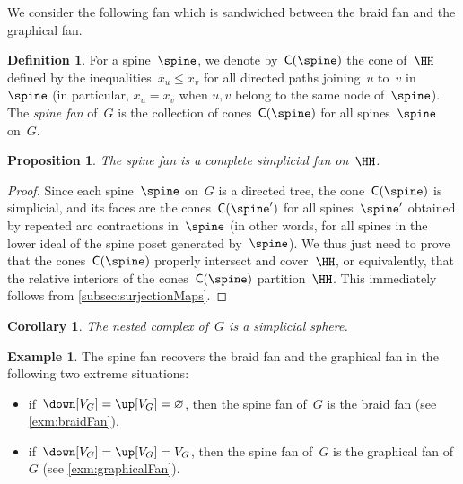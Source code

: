\documentclass{amsart}
\newtheorem{corollary}[theorem]{Corollary}
\newtheorem{proposition}[theorem]{Proposition}
\theoremstyle{definition}
\newtheorem{definition}[theorem]{Definition}
\newtheorem{example}[theorem]{Example}
\renewcommand{\b}[1]{{\boldsymbol{#1}}} %
\newcommand{\set}[2]{\left\{ #1 \;\middle|\; #2 \right\}} %
\newcommand{\eqdef}{\mbox{\,\raisebox{0.2ex}{\scriptsize\ensuremath{\mathrm:}}\ensuremath{=}\,}} %
\newcommand{\darkblue}{\color{darkblue}} %
\newcommand{\defn}[1]{\textsl{\darkblue #1}} %
\newcommand{\vincent}[1]{\todo[color=blue!30]{#1 \\ \hfill --- V.}}
\newcommand{\normalCone}{\mathsf{C}} %
\begin{document}
We consider the following fan which is sandwiched between the braid fan and the graphical fan.

\begin{definition}
  \label{def:spineFan}
  For a spine~$\spine$, we denote by~$\normalCone(\spine)$ the cone of~$\HH$ defined by the inequalities~$x_u \le x_v$ for all directed paths joining~$u$ to~$v$ in~$\spine$ (in particular, $x_u = x_v$ when $u,v$ belong to the same node of~$\spine$).
  The \defn{spine fan} of~$G$ is the collection of cones~$\normalCone(\spine)$ for all spines~$\spine$ on~$G$.  
\end{definition}

\begin{proposition}
  \label{prop:spineFan}
  The spine fan is a complete simplicial fan on~$\HH$.
\end{proposition}

\begin{proof}
  Since each spine~$\spine$ on~$G$ is a directed tree, the cone~$\normalCone(\spine)$ is simplicial, and its faces are the cones~$\normalCone(\spine')$ for all spines~$\spine'$ obtained by repeated arc contractions in~$\spine$ (in other words, for all spines in the lower ideal of the spine poset generated by~$\spine$).
  We thus just need to prove that the cones~$\normalCone(\spine)$ properly intersect and cover~$\HH$, or equivalently, that the relative interiors of the cones~$\normalCone(\spine)$ partition~$\HH$.
  This immediately follows from \cref{subsec:surjectionMaps}.
  \vincent{Be more precise here.}
\end{proof}

\begin{corollary} 
   The nested complex of~$G$ is a simplicial sphere.
\end{corollary}

%

\begin{example}
  \label{exm:braidFanGraphicalFan}
  The spine fan recovers the braid fan and the graphical fan in the following two extreme situations:
  \begin{itemize}
    \item if~$\down[V_G] = \up[V_G] = \varnothing$, then the spine fan of~$G$ is the braid fan (see \cref{exm:braidFan}),
    \item if~$\down[V_G] = \up[V_G] = V_G$, then the spine fan of~$G$ is the graphical fan of~$G$ (see \cref{exm:graphicalFan}).
  \end{itemize}
\end{example}
\end{document}
